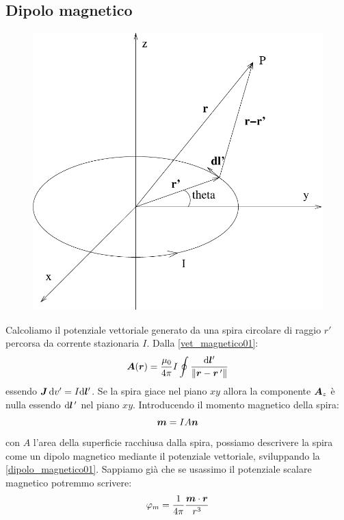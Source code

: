 \subsection{Dipolo magnetico\label{dipolo!magnetico}}
\begin{figure}[htbp]
\centering
\includegraphics[scale=0.5]{immagini/fisica2/spira_vettore}
\end{figure}
Calcoliamo il potenziale vettoriale generato da una spira circolare di raggio $r'$ percorsa da corrente stazionaria $I$. Dalla \eqref{vet_magnetico01}:
\begin{equation}
\boldsymbol{A}(\boldsymbol{r})=\frac{\mu_0}{4\pi}I\oint\frac{\mathrm{d} \boldsymbol{l}'}{\left\lVert\boldsymbol{r}-\boldsymbol{r}\,'\right\rVert}
\label{dipolo_magnetico01}
\end{equation}
essendo $\boldsymbol{J}\,\mathrm{d} v'=I\mathrm{d}\boldsymbol{l}'$. Se la spira giace nel piano $xy$ allora la componente $\boldsymbol{A}_z$ è nulla essendo $\mathrm{d} \boldsymbol{l}\,'$ nel piano $xy$. Introducendo il momento magnetico della spira:
\begin{equation}
\boldsymbol{m}=IA\boldsymbol{n}
\end{equation}
con $A$ l'area della superficie racchiusa dalla spira, possiamo descrivere la spira come un dipolo magnetico mediante il potenziale vettoriale, sviluppando la \eqref{dipolo_magnetico01}. Sappiamo già che se usassimo il potenziale scalare magnetico potremmo scrivere:
\begin{equation}
\varphi_m=\frac{1}{4\pi}\frac{\boldsymbol{m}\cdot\boldsymbol{r}}{r^3}
\end{equation}

